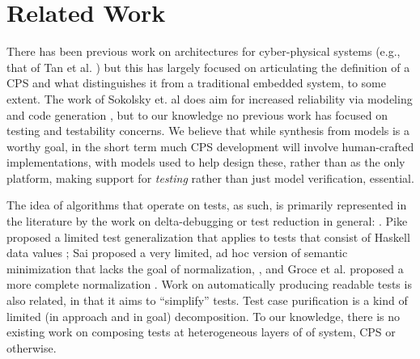 \section{Related Work}

There has been previous work on architectures for cyber-physical systems (e.g., that of Tan et al. \cite{tan2008prototype}) but this has largely focused on articulating the definition of a CPS and what distinguishes it from a traditional embedded system, to some extent.  The work of Sokolsky et. al does aim for increased reliability via modeling and code generation \cite{sokolsky2014architecture}, but to our knowledge no previous work has focused on testing and testability concerns.  We believe that while synthesis from models is a worthy goal, in the short term much CPS development will involve human-crafted implementations, with models used to help design these, rather than as the only platform, making support for \emph{testing} rather than just model verification, essential.

The idea of algorithms that operate on tests, as such, is
primarily represented in the literature by the work on
delta-debugging or test reduction in general:
\cite{DD,HDD,TCminim,MinUnit,CReduce,Lithium,DDISSTA,IsolThread,Yesterday}.  Pike proposed a limited test
generalization that applies to tests that consist of Haskell data
values \cite{SmartCheck}; Sai proposed a very limited, ad hoc
version of semantic minimization that lacks the goal of normalization,
 \cite{SaiSimple}, and Groce et al. proposed a more complete normalization \cite{OneTest}.  Work on automatically producing readable tests \cite{Readable} is also
related, in that it aims to ``simplify'' tests.  Test case
purification \cite{PureTest} is a kind of limited (in approach and in
goal) decomposition.  To our knowledge, there is no existing work on composing tests at heterogeneous layers of of system, CPS or otherwise.